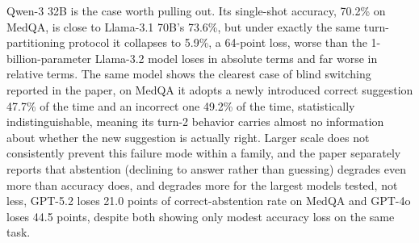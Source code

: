 \begin{table}[htbp]
\centering
\footnotesize
\caption{Positive conviction rate (holds a correct answer against a competing suggestion), single-shot vs.\ multi-turn, selected models and datasets~\citep{StopListeningToMe_Guo}. The 17-model average is given in the final row.}
\label{tab:stoplistening_full}
\end{table}

Qwen-3 32B is the case worth pulling out. Its single-shot accuracy, 70.2\% on MedQA, is close to Llama-3.1 70B's 73.6\%, but under exactly the same turn-partitioning protocol it collapses to 5.9\%, a 64-point loss, worse than the 1-billion-parameter Llama-3.2 model loses in absolute terms and far worse in relative terms. The same model shows the clearest case of blind switching reported in the paper, on MedQA it adopts a newly introduced correct suggestion 47.7\% of the time and an incorrect one 49.2\% of the time, statistically indistinguishable, meaning its turn-2 behavior carries almost no information about whether the new suggestion is actually right. Larger scale does not consistently prevent this failure mode within a family, and the paper separately reports that abstention (declining to answer rather than guessing) degrades even more than accuracy does, and degrades more for the largest models tested, not less, GPT-5.2 loses 21.0 points of correct-abstention rate on MedQA and GPT-4o loses 44.5 points, despite both showing only modest accuracy loss on the same task.

